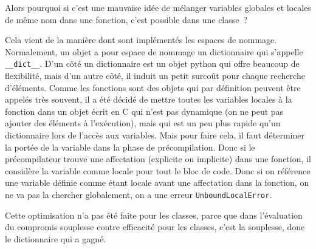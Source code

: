     Alors pourquoi si c'est une mauvaise idée de mélanger variables globales
et locales de même nom dans une fonction, c'est possible dans une
classe~?

Cela vient de la manière dont sont implémentés les espaces de nommage.
Normalement, un objet a pour espace de nommage un dictionnaire qui
s'appelle \texttt{\_\_dict\_\_}. D'un côté un dictionnaire est un objet
python qui offre beaucoup de flexibilité, mais d'un autre côté, il
induit un petit surcoût pour chaque recherche d'éléments. Comme les
fonctions sont des objets qui par définition peuvent être appelés très
souvent, il a été décidé de mettre toutes les variables locales à la
fonction dans un objet écrit en C qui n'est pas dynamique (on ne peut
pas ajouter des éléments à l'exécution), mais qui est un peu plus rapide
qu'un dictionnaire lors de l'accès aux variables. Mais pour faire cela,
il faut déterminer la portée de la variable dans la phase de
précompilation. Donc si le précompilateur trouve une affectation
(explicite ou implicite) dans une fonction, il considère la variable
comme locale pour tout le bloc de code. Donc si on référence une
variable définie comme étant locale avant une affectation dans la
fonction, on ne va pas la chercher globalement, on a une erreur
\texttt{UnboundLocalError}.

Cette optimisation n'a pas été faite pour les classes, parce que dans
l'évaluation du compromis souplesse contre efficacité pour les classes,
c'est la souplesse, donc le dictionnaire qui a gagné.


    
    
    
